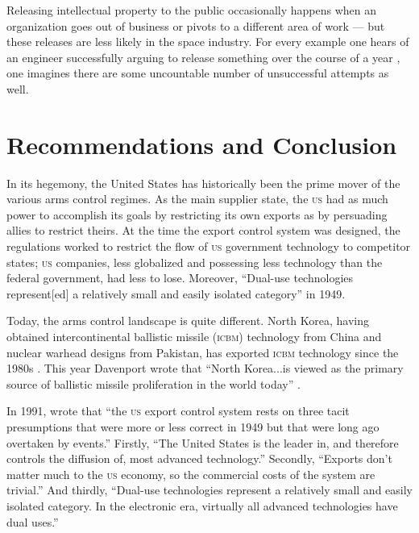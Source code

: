 \documentclass[12pt]{olfmemo}
\begin{document}
Releasing intellectual property to the public occasionally happens when an organization goes out of business or pivots to a different area of work --- but these releases are less likely in the space industry. For every example one hears of an engineer successfully arguing to release something over the course of a year \citep{Scoles2017}, one imagines there are some uncountable number of unsuccessful attempts as well.

\section{Recommendations and Conclusion}
In its hegemony, the United States has historically been the prime mover of the various arms control regimes. As the main supplier state, the \textsc{us} had as much power to accomplish its goals by restricting its own exports as by persuading allies to restrict theirs. At the time the export control system was designed, the regulations worked to restrict the flow of \textsc{us} government technology to competitor states; \textsc{us} companies, less globalized and possessing less technology than the federal government, had less to lose. Moreover, ``Dual-use technologies represent[ed] a relatively small and easily isolated category'' in 1949. \citep{Kuttner1991}

Today, the arms control landscape is quite different. North Korea, having obtained intercontinental ballistic missile (\textsc{icbm}) technology from China and nuclear warhead designs from Pakistan, has exported \textsc{icbm} technology since the 1980s \citep{Squassoni2006}. This year Davenport wrote that ``North Korea...is viewed as the primary source of ballistic missile proliferation in the world today'' \citep{Davenport2021}.

In 1991, \citet{Kuttner1991} wrote that ``the \textsc{us} export control system rests on three tacit presumptions that were more or less correct in 1949 but that were long ago overtaken by events.'' Firstly, ``The United States is the leader in, and therefore controls the diffusion of, most advanced technology.'' Secondly, ``Exports don’t matter much to the \textsc{us} economy, so the commercial costs of the system are trivial.'' And thirdly, ``Dual-use technologies represent a relatively small and easily isolated category. In the electronic era, virtually all advanced technologies have dual uses.''
\end{document}
